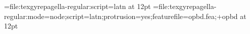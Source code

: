 

 

\font\testa=file:texgyrepagella-regular:script=latn                                at 12pt
\font\testb=file:texgyrepagella-regular:mode=node;script=latn;protrusion=yes;featurefile=opbd.fea;+opbd at 12pt
\testa  \par
\testb  \par
\bye
